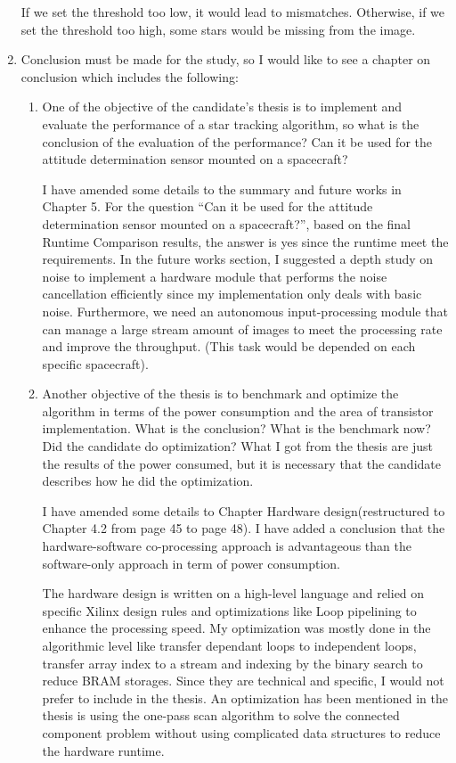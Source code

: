 \documentclass[dvips,a4paper,12pt]{report}
\begin{document}
\begin{enumerate}
    If we set the threshold too low, it would lead to mismatches. Otherwise, if we set the threshold too high, some stars would be missing from the image.

    \color{blue}
    \item Conclusion must be made for the study, so I would like to see a chapter on conclusion which includes the following:

    \begin{enumerate}[label=(\alph*)]
        \color{blue}
        \item One of the objective of the candidate's thesis is to implement and evaluate the performance of a star tracking algorithm, so what is the conclusion of the evaluation of the performance? Can it be used for the attitude determination sensor mounted on a spacecraft?

        \color{black}
        I have amended some details to the summary and future works in Chapter 5. For the question ``Can it be used for the attitude determination sensor mounted on a spacecraft?'', based on the final Runtime Comparison results, the answer is yes since the runtime meet the requirements. In the future works section, I suggested a depth study on noise to implement a hardware module that performs the noise cancellation efficiently since my implementation only deals with basic noise. Furthermore, we need an autonomous input-processing module that can manage a large stream amount of images to meet the processing rate and improve the throughput. (This task would be depended on each specific spacecraft). \\

        \color{blue}
        \item Another objective of the thesis is to benchmark and optimize the algorithm in terms of the power consumption and the area of transistor implementation. What is the conclusion? What is the benchmark now? Did the candidate do optimization? What I got from the thesis are just the results of the power consumed, but it is necessary that the candidate describes how he did the optimization.

        \color{black}
        I have amended some details to Chapter Hardware design(restructured to Chapter 4.2 from page 45 to page 48). I have added a conclusion that the hardware-software co-processing approach is advantageous than the software-only approach in term of power consumption. 

        The hardware design is written on a high-level language and relied on specific Xilinx design rules and optimizations like Loop pipelining to enhance the processing speed. My optimization was mostly done in the algorithmic level like transfer dependant loops to independent loops, transfer array index to a stream and indexing by the binary search to reduce BRAM storages. Since they are technical and specific, I would not prefer to include in the thesis. An optimization has been mentioned in the thesis is using the one-pass scan algorithm to solve the connected component problem without using complicated data structures to reduce the hardware runtime. \\


\end{enumerate}
\end{enumerate}
\end{document}
